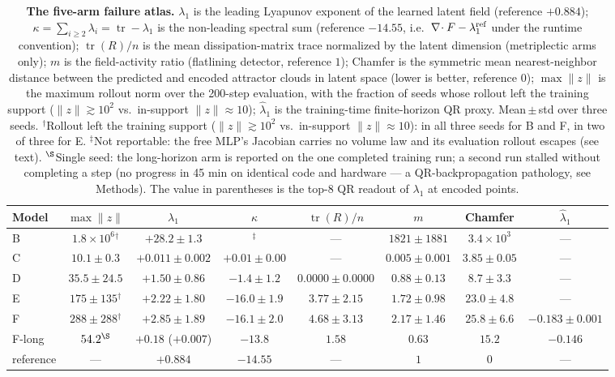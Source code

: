 \documentclass[journal]{IEEEtran}
\newcommand{\tr}{\operatorname{tr}}
\newcommand{\grad}{\nabla}
\begin{document}
\begin{table}[t]
\centering
\caption{\textbf{The five-arm failure atlas.} $\lambda_1$ is the leading
Lyapunov exponent of the learned latent field (reference $+0.884$);
$\kappa=\sum_{i\ge2}\lambda_i=\tr-\lambda_1$ is the non-leading spectral
sum (reference $-14.55$, i.e.\ $\grad\!\cdot F-\lambda_1^{\rm ref}$ under
the runtime convention); $\tr(R)/n$ is the mean dissipation-matrix trace
normalized by the latent dimension (metriplectic arms only); $m$ is the
field-activity ratio (flatlining detector, reference $1$); Chamfer is the
symmetric mean nearest-neighbor distance between the predicted and
encoded attractor clouds in latent space (lower is better, reference
$0$); $\max\|z\|$ is the maximum rollout norm over the 200-step
evaluation, with the fraction of seeds whose rollout left the training
support ($\|z\|\gtrsim10^2$ vs.\ in-support $\|z\|\approx10$);
$\hat\lambda_1$ is the training-time finite-horizon QR proxy.
Mean\,$\pm$\,std over three seeds. ${}^\dagger$Rollout left the training
support ($\|z\|\gtrsim10^2$ vs.\ in-support $\|z\|\approx10$): in all three seeds for B and F, in two of three for E. ${}^\ddagger$Not
reportable: the free MLP's Jacobian carries no volume law and its
evaluation rollout escapes (see text). ${}^\S$Single seed: the
long-horizon arm is reported on the one completed training run; a second
run stalled without completing a step (no progress in 45 min on
identical code and hardware --- a QR-backpropagation pathology, see
Methods). The value in parentheses is the top-8 QR readout of
$\lambda_1$ at encoded points.}
\label{tab:atlas}
\begingroup\footnotesize\setlength{\tabcolsep}{3pt}
\begin{tabular}{lccccccc}
\toprule
Model & $\max\|z\|$ & $\lambda_1$ & $\kappa$ & $\tr(R)/n$ & $m$ & Chamfer & $\hat\lambda_1$ \\
\midrule
B & $1.8{\times}10^6{}^{\dagger}$ & $+28.2\pm1.3$ & ${}^{\ddagger}$ & --- & $1821\pm1881$ & $3.4{\times}10^3$ & --- \\
C & $10.1\pm0.3$ & $+0.011\pm0.002$ & $+0.01\pm0.00$ & --- & $0.005\pm0.001$ & $3.85\pm0.05$ & --- \\
D & $35.5\pm24.5$ & $+1.50\pm0.86$ & $-1.4\pm1.2$ & $0.0000\pm0.0000$ & $0.88\pm0.13$ & $8.7\pm3.3$ & --- \\
E & $175\pm135{}^{\dagger}$ & $+2.22\pm1.80$ & $-16.0\pm1.9$ & $3.77\pm2.15$ & $1.72\pm0.98$ & $23.0\pm4.8$ & --- \\
F & $288\pm288{}^{\dagger}$ & $+2.85\pm1.89$ & $-16.1\pm2.0$ & $4.68\pm3.13$ & $2.17\pm1.46$ & $25.8\pm6.6$ & $-0.183\pm0.001$ \\
F-long & $54.2{}^{\S}$ & $+0.18$ ($+0.007$)& $-13.8$ & $1.58$ & $0.63$ & $15.2$ & $-0.146$ \\
\midrule
reference & --- & $+0.884$ & $-14.55$ & --- & $1$ & $0$ & --- \\
\bottomrule
\end{tabular}
\endgroup
\end{table}
\end{document}
